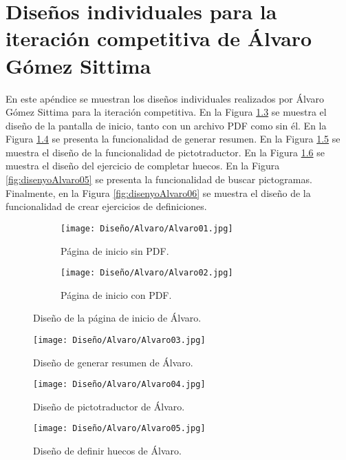 \chapter{Diseños individuales para la iteración competitiva de Álvaro Gómez Sittima}
\label{ape:disenyoAlvaro}
En este apéndice se muestran los diseños individuales realizados por Álvaro Gómez Sittima para la iteración competitiva. En la Figura \ref{fig:disenyoAlvaro01} se muestra el diseño de la pantalla de inicio, tanto con un archivo PDF como sin él. En la Figura \ref{fig:disenyoAlvaro02} se presenta la funcionalidad de generar resumen. En la Figura \ref{fig:disenyoAlvaro03} se muestra el diseño de la funcionalidad de pictotraductor. En la Figura \ref{fig:disenyoAlvaro04} se muestra el diseño del ejercicio de completar huecos. En la Figura \ref{fig:disenyoAlvaro05} se presenta la funcionalidad de buscar pictogramas. Finalmente, en la Figura \ref{fig:disenyoAlvaro06} se muestra el diseño de la funcionalidad de crear ejercicios de definiciones.

\begin{figure}[h!]
  \centering
  \begin{subfigure}{\textwidth}
    \centering
    \texttt{[image: Diseño/Alvaro/Alvaro01.jpg]}
    \caption{Página de inicio sin PDF.}
    \label{fig:disenyoAlvaro01a}
  \end{subfigure}
  \begin{subfigure}{\textwidth}
    \centering
    \texttt{[image: Diseño/Alvaro/Alvaro02.jpg]}
    \caption{Página de inicio con PDF.}
    \label{fig:disenyoAlvaro01b}
  \end{subfigure}

  \caption{Diseño de la página de inicio de Álvaro.}
  \label{fig:disenyoAlvaro01}
\end{figure}

\begin{figure}[ht!]
  \centering
  \texttt{[image: Diseño/Alvaro/Alvaro03.jpg]}
  \caption{Diseño de generar resumen de Álvaro.}
  \label{fig:disenyoAlvaro02}
\end{figure}

\begin{figure}[ht!]
  \centering
  \texttt{[image: Diseño/Alvaro/Alvaro04.jpg]}
  \caption{Diseño de pictotraductor de Álvaro.}
  \label{fig:disenyoAlvaro03}
\end{figure}

\begin{figure}[ht!]
  \centering
  \texttt{[image: Diseño/Alvaro/Alvaro05.jpg]}
  \caption{Diseño de definir huecos de Álvaro.}
  \label{fig:disenyoAlvaro04}
\end{figure}


